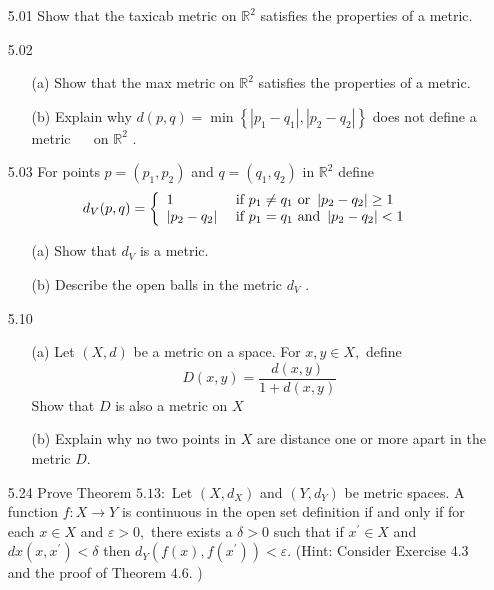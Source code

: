 \documentclass[12pt]{article}
\begin{document}
\pagestyle{fancy}  
\lfoot{} \cfoot{} \rfoot{}

\begin{enumerate}

	\item[5.01] Show that the taxicab metric on $\mathbb { R } ^ { 2 }$ satisfies the properties of a metric.
	
	\item[5.02] 
	\begin{enumerate}
		\item[(a)] Show that the max metric on $\mathbb { R } ^ { 2 }$ satisfies the properties of a metric.	
		\item[(b)] Explain why $d ( p , q ) = \min \left\{ \left| p _ { 1 } - q _ { 1 } \right| , \left| p _ { 2 } - q _ { 2 } \right| \right\}$ does not define a metric $\quad$ on $\mathbb { R } ^ { 2 }$ .
	\end{enumerate}
	\item[5.03] For points $p = \left( p _ { 1 } , p _ { 2 } \right)$ and $q = \left( q _ { 1 } , q _ { 2 } \right)$ in $\mathbb { R } ^ { 2 }$ define
		\[d _ { V } ( p , q ) = \left\{ \begin{array} { l l } { 1 } & { \text { if } p _ { 1 } \neq q _ { 1 } \text { or } \left| p _ { 2 } - q _ { 2 } \right| \geq 1 } \\ { \left| p _ { 2 } - q _ { 2 } \right| } & { \text { if } p _ { 1 } = q _ { 1 } \text { and } \left| p _ { 2 } - q _ { 2 } \right| < 1 } \end{array} \right.\]
	\begin{enumerate}
		\item[(a)] Show that $d _ { V }$ is a metric.
	
		\item[(b)] 	Describe the open balls in the metric $d _ { V }$ .
	\end{enumerate}
	\item[5.10]
	\begin{enumerate}
		\item[(a)] Let $( X , d )$ be a metric on a space. For $x , y \in X ,$ define
		\[D ( x , y ) = \frac { d ( x , y ) } { 1 + d ( x , y ) }\]
		Show that $D$ is also a metric on $ X $
		
		\item[(b)] Explain why no two points in $X$ are distance one or more apart in the
		metric $D .$
	\end{enumerate}
	
	\item[5.24] Prove Theorem $5.13 :$ Let $\left( X , d _ { X } \right)$ and $\left( Y , d _ { Y } \right)$ be metric spaces. A function
	$f : X \rightarrow Y$ is continuous in the open set definition if and only if for each $x \in X$ and $\varepsilon > 0 ,$ there exists a $\delta > 0$ such that if $x ^ { \prime } \in X$ and $d x \left( x , x ^ { \prime } \right) < \delta$
	then $d _ { Y } \left( f ( x ) , f \left( x ^ { \prime } \right) \right) < \varepsilon .$ (Hint: Consider Exercise 4.3 and the proof of
	Theorem $4.6 .$ )
	

\end{enumerate}
\end{document}
